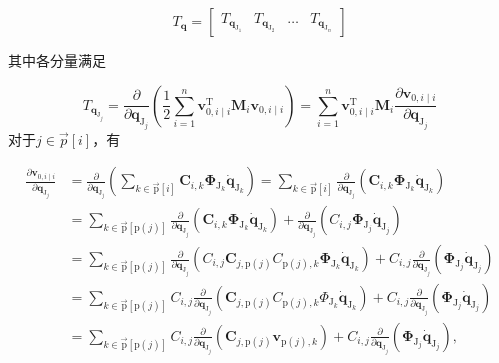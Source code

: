 \[
T_{\boldsymbol{q}}=\left[\begin{array}{llll}
T_{\boldsymbol{q}_{\mathrm{J}_{1}}} & T_{\boldsymbol{q}_{\mathrm{J}_{2}}} & \ldots & T_{\boldsymbol{q}_{\mathrm{J}_{n}}}
\end{array}\right]
\]

其中各分量满足

\[
T_{\boldsymbol{q}_{\mathrm{J}_{j}}}=\frac{\partial}{\partial \boldsymbol{q}_{\mathrm{J}_{j}}}\left(\frac{1}{2} \sum_{i=1}^{n} \boldsymbol{v}_{0, i \mid i}^{\mathrm{T}} \boldsymbol{M}_{i} \boldsymbol{v}_{0, i \mid i}\right)=\sum_{i=1}^{n} \boldsymbol{v}_{0, i \mid i}^{\mathrm{T}} \boldsymbol{M}_{i} \frac{\partial \boldsymbol{v}_{0, i \mid i}}{\partial \boldsymbol{q}_{\mathrm{J}_{j}}}
\]
对于$j \in \vec{p}[i]$，有

\[
\begin{aligned}
\frac{\partial \boldsymbol{v}_{0, i \mid i}}{\partial \boldsymbol{q}_{\mathrm{J}_{j}}} & =\frac{\partial}{\partial \boldsymbol{q}_{\mathrm{J}_{j}}}\left(\sum_{k \in \overrightarrow{\mathrm{p}}[i]} \boldsymbol{C}_{i, k} \boldsymbol{\Phi}_{\mathrm{J}_{k}} \dot{\boldsymbol{q}}_{\mathrm{J}_{k}}\right)=\sum_{k \in \overrightarrow{\mathrm{p}}[i]} \frac{\partial}{\partial \boldsymbol{q}_{\mathrm{J}_{j}}}\left(\boldsymbol{C}_{i, k} \boldsymbol{\Phi}_{\mathrm{J}_{k}} \dot{\boldsymbol{q}}_{\mathrm{J}_{k}}\right) \\
& =\sum_{k \in \overrightarrow{\mathrm{p}}[\mathrm{p}(j)]} \frac{\partial}{\partial \boldsymbol{q}_{\mathrm{J}_{j}}}\left(\boldsymbol{C}_{i, k} \boldsymbol{\Phi}_{\mathrm{J}_{k}} \dot{\boldsymbol{q}}_{\mathrm{J}_{k}}\right)+\frac{\partial}{\partial \boldsymbol{q}_{\mathrm{J}_{j}}}\left(C_{i, j} \boldsymbol{\Phi}_{\mathrm{J}_{j}} \dot{\boldsymbol{q}}_{\mathrm{J}_{j}}\right) \\
& =\sum_{k \in \overrightarrow{\mathrm{p}}[\mathrm{p}(j)]} \frac{\partial}{\partial \boldsymbol{q}_{\mathrm{J}_{j}}}\left(C_{i, j} \boldsymbol{C}_{j, \mathrm{p}(j)} C_{\mathrm{p}(j), k} \boldsymbol{\Phi}_{\mathrm{J}_{k}} \dot{\boldsymbol{q}}_{\mathrm{J}_{k}}\right)+C_{i, j} \frac{\partial}{\partial \boldsymbol{q}_{\mathrm{J}_{j}}}\left(\boldsymbol{\Phi}_{\mathrm{J}_{j}} \dot{\boldsymbol{q}}_{\mathrm{J}_{j}}\right) \\
& =\sum_{k \in \overrightarrow{\mathrm{p}}[\mathrm{p}(j)]} C_{i, j} \frac{\partial}{\partial \boldsymbol{q}_{\mathrm{J}_{j}}}\left(\boldsymbol{C}_{j, \mathrm{p}(j)} C_{\mathrm{p}(j), k} \Phi_{\mathrm{J}_{k}} \dot{\boldsymbol{q}}_{\mathrm{J}_{k}}\right)+C_{i, j} \frac{\partial}{\partial \boldsymbol{q}_{\mathrm{J}_{j}}}\left(\boldsymbol{\Phi}_{\mathrm{J}_{j}} \dot{\boldsymbol{q}}_{\mathrm{J}_{j}}\right) \\
& =\sum_{k \in \overrightarrow{\mathrm{p}}[\mathrm{p}(j)]} C_{i, j} \frac{\partial}{\partial \boldsymbol{q}_{\mathrm{J}_{j}}}\left(\boldsymbol{C}_{j, \mathrm{p}(j)} \boldsymbol{v}_{\mathrm{p}(j), k}\right)+C_{i, j} \frac{\partial}{\partial \boldsymbol{q}_{\mathrm{J}_{j}}}\left(\boldsymbol{\Phi}_{\mathrm{J}_{j}} \dot{\boldsymbol{q}}_{\mathrm{J}_{j}}\right),
\end{aligned}
\]

